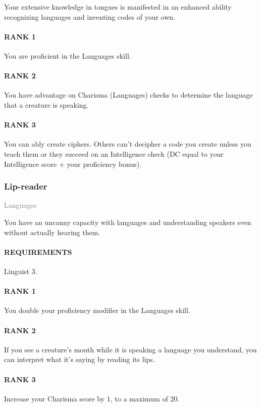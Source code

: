 \normalsize
Your extensive knowledge in tongues is manifested in an enhanced ability recognizing languages and inventing codes of your own.
\paragraph{RANK 1} You are proficient in the Languages skill.
\paragraph{RANK 2} You have advantage on Charisma (Languages) checks to determine the language that a creature is speaking.
\paragraph{RANK 3} You can ably create ciphers.
Others can't decipher a code you create unless you teach them or they succeed on an Intelligence check (DC equal to your Intelligence score + your proficiency bonus).

\subsubsection{Lip-reader} \label{feat::lipreader}
\small{\textcolor{gray}{Languages}}

\normalsize
You have an uncanny capacity with languages and understanding speakers even without actually hearing them.
\paragraph{REQUIREMENTS} Linguist 3.
\paragraph{RANK 1} You double your proficiency modifier in the Languages skill.
\paragraph{RANK 2} If you see a creature's mouth while it is speaking a language you understand, you can interpret what it's saying by reading its lips.
\paragraph{RANK 3} Increase your Charisma score by 1, to a maximum of 20.

